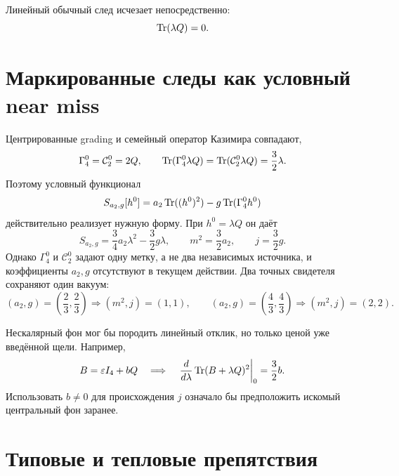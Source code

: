 Линейный обычный след исчезает непосредственно:
\begin{equation}
 \operatorname{Tr}(\lambda Q)=0.
 \label{eq:v8-baryon-c0-gap-origin-ordinary-linear-trace-zero}
\end{equation}

\section{Маркированные следы как условный near miss}

Центрированные grading и семейный оператор Казимира совпадают,
\begin{equation}
 \Gamma_4^0=\mathcal C_2^0=2Q,
 \qquad
 \operatorname{Tr}(\Gamma_4^0\lambda Q)
 =\operatorname{Tr}(\mathcal C_2^0\lambda Q)=\frac32\lambda.
 \label{eq:v8-baryon-c0-gap-origin-marked-linear-responses}
\end{equation}
Поэтому условный функционал
\begin{equation}
 S_{a_2,g}[h^0]=a_2\operatorname{Tr}((h^0)^2)-g\operatorname{Tr}(\Gamma_4^0h^0)
 \label{eq:v8-baryon-c0-gap-origin-conditional-marked-parent}
\end{equation}
действительно реализует нужную форму. При $h^0=\lambda Q$ он даёт
\begin{equation}
 S_{a_2,g}=\frac34a_2\lambda^2-\frac32g\lambda,
 \qquad m^2=\frac32a_2,
 \qquad j=\frac32g.
 \label{eq:v8-baryon-c0-gap-origin-conditional-coefficient-map}
\end{equation}
Однако $\Gamma_4^0$ и $\mathcal C_2^0$ задают одну метку, а не два
независимых источника, и коэффициенты $a_2,g$ отсутствуют в текущем
действии. Два точных свидетеля сохраняют один вакуум:
\begin{equation}
 (a_2,g)=\left(\frac23,\frac23\right)\Longrightarrow(m^2,j)=(1,1),
 \qquad
 (a_2,g)=\left(\frac43,\frac43\right)\Longrightarrow(m^2,j)=(2,2).
 \label{eq:v8-baryon-c0-gap-origin-free-coefficient-witnesses}
\end{equation}

Нескалярный фон мог бы породить линейный отклик, но только ценой уже
введённой щели. Например,
\begin{equation}
 B=\varepsilon I_4+bQ
 \quad\Longrightarrow\quad
 \left.\frac{d}{d\lambda}\operatorname{Tr}(B+\lambda Q)^2\right|_0
 =\frac32b.
 \label{eq:v8-baryon-c0-gap-origin-circular-background-source}
\end{equation}
Использовать $b\ne0$ для происхождения $j$ означало бы предположить искомый
центральный фон заранее.

\section{Типовые и тепловые препятствия}

